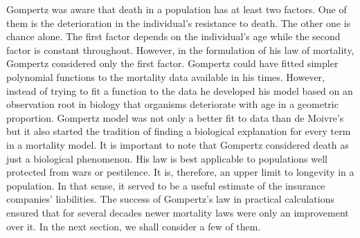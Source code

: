 \documentclass{article}
\numberwithin{equation}{section}
\begin{document}
Gompertz was aware that death in a population has at least two factors. One
of them is the deterioration in the individual's resistance to death. The 
other one is chance alone. The first factor depends on the individual's age
while the second factor is constant throughout. However, in the formulation
of his law of mortality, Gompertz considered only the first factor. Gompertz
could have fitted simpler polynomial functions to the mortality data available
in his times. However, instead of trying to fit a function to the data he
developed his model based on an observation root in biology that organisms
deteriorate with age in a geometric proportion. Gompertz model was not only a
better fit to data than de Moivre's but it also started the tradition of
finding a biological explanation for every term in a mortality model. It is
important to note that Gompertz considered death as just a biological 
phenomenon. His law is best applicable to populations well protected from 
wars or pestilence. It is, therefore, an upper limit to longevity in a
population. In that sense, it served to be a useful estimate of the insurance
companies' liabilities. The success of Gompertz's law in practical calculations
ensured that for several decades newer mortality laws were only an improvement
over it. In the next section, we shall consider a few of them.
\end{document}

